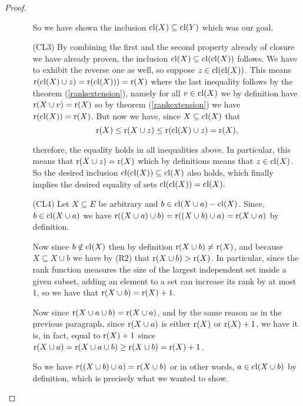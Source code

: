 \begin{proof}
\begin{enumerate}
\begin{enumerate}
            So we have shown the inclusion $\mathrm{cl}(X) \subseteq \mathrm{cl}(Y)$ which was our goal.
    
            \item[(CL3)] By combining the first and the second property already of closure we have already proven, the inclusion $\mathrm{cl}(X) \subseteq \mathrm{cl}(\mathrm{cl}(X))$  follows. We have to exhibit the reverse one as well, so suppose $z\in \mathrm{cl}(\mathrm{cl}(X))$. This means $\operatorname{r}(\mathrm{cl}(X) \cup z)= \operatorname{r}(\mathrm{cl}(X))) = \operatorname{r}(X)$ where the last inequality follows by the theorem (\ref{rankextension}), namely for all $v \in \mathrm{cl}(X)$ we by definition have $\operatorname{r}(X \cup v) = \operatorname{r}(X)$ so by theorem (\ref{rankextension}) we have $\operatorname{r}(\mathrm{cl}(X)) = \operatorname{r}(X)$. But now we have, since $X \subseteq \mathrm{cl}(X)$ that $$\operatorname{r}(X) \leq \operatorname{r}(X \cup z) \leq \operatorname{r}(\mathrm{cl}(X)\cup z) = \operatorname{r}(X),$$
    
           therefore, the equality holds in all inequalities above. In particular, this means that $\operatorname{r}(X \cup z) = \operatorname{r}(X)$ which by definitions means that $z \in \mathrm{cl}(X)$. So the desired inclusion $ \mathrm{cl}(\mathrm{cl}(X))\subseteq \mathrm{cl}(X)$ also holds, which finally implies the desired equality of sets $\mathrm{cl}(\mathrm{cl}(X))= \mathrm{cl}(X).$
    
            \item[(CL4)] Let $X \subseteq E$ be arbitrary and $b \in \mathrm{cl}(X \cup a) - \mathrm{cl}(X)$. Since, $b \in \mathrm{cl}(X \cup a)$ we have $\operatorname{r}((X\cup a)\cup b) = \operatorname{r}((X\cup b) \cup a) = \operatorname{r}(X \cup a)$ by definition. 
    
            Now since $b \notin \mathrm{cl}(X)$ then by definition $\operatorname{r}(X \cup b)\neq \operatorname{r}(X)$, and because $X \subseteq X \cup b$ we have by (R2) that $\operatorname{r}(X \cup b) > \operatorname{r}(X)$. In particular, since the rank function measures the size of the largest independent set inside a given subset, adding an element to a set can increase its rank by at most 1, so we have that $\operatorname{r}(X \cup b) = \operatorname{r}(X)+1.$ 
    
            Now since $\operatorname{r}(X \cup a \cup b) = \operatorname{r}(X \cup a)$, and by the same reason as in the previous paragraph, since $\operatorname{r}(X \cup a)$ is either $\operatorname{r}(X)$ or $\operatorname{r}(X) + 1$, we have it is, in fact, equal to $\operatorname{r}(X) + 1$ since $\operatorname{r}(X \cup a) = \operatorname{r}(X \cup a \cup b) \geq \operatorname{r}(X \cup b)= \operatorname{r}(X) + 1$.
    
            So we have $r((X\cup b) \cup a) = \operatorname{r}(X \cup b)$ or in other words, $a \in \mathrm{cl}(X \cup b)$ by definition, which is precisely what we wanted to show.
           
            \end{enumerate}
    



\end{enumerate}
\end{proof}
